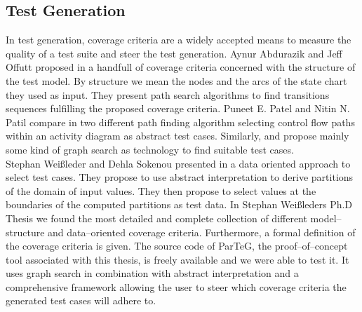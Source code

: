 \subsection{Test Generation}
In test generation, coverage criteria are a widely accepted means to measure the quality of a test suite and steer the test generation. Aynur Abdurazik and Jeff Offutt proposed in \cite{Offutt99GeneratingTestsFromUmlSpec} a handfull of coverage criteria concerned with the structure of the test model. By structure we mean the nodes and the arcs of the state chart they used as input. They present path search algorithms to find transitions sequences fulfilling the proposed coverage criteria.
Puneet E. Patel and Nitin N. Patil compare in \cite{Patel12TestCaseFormationUsigUMLActivityDiagram} two different path finding algorithm selecting control flow paths within an activity diagram as abstract test cases. Similarly, \cite{kundu2009novel} and \cite{Linzhang04GeneratingTestCasefromActivityGrayBoxMethod} propose mainly some kind of graph search as technology to find suitable test cases.\\
Stephan Wei{\ss}leder and Dehla Sokenou presented in \cite{weissleder2008automatic} a data oriented approach to select test cases. They propose to use abstract interpretation to derive partitions of the domain of input values. They then propose to select values at the boundaries of the computed partitions as test data.
In Stephan Wei{\ss}leders Ph.D Thesis \cite{ParTeG} we found the most detailed and complete collection of different model--structure and data--oriented coverage criteria. Furthermore, a formal definition of the coverage criteria is given. The source code of ParTeG, the proof--of--concept tool associated with this thesis, is freely available and we were able to test it. It uses graph search in combination with abstract interpretation and a comprehensive framework allowing the user to steer which coverage criteria the generated test cases will adhere to.\\
